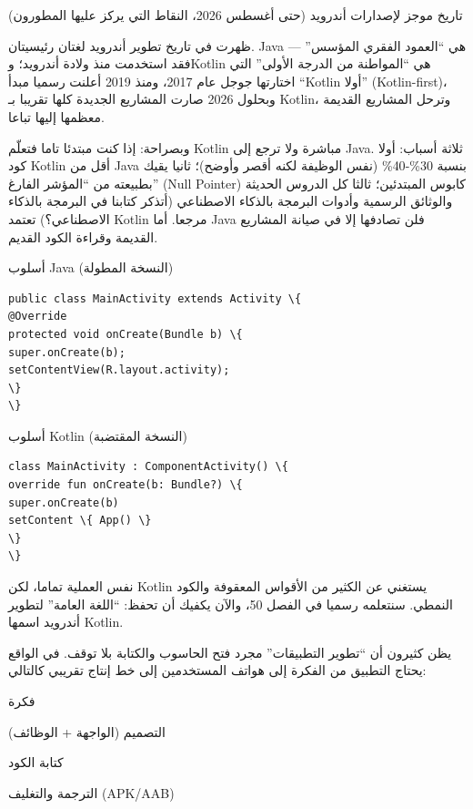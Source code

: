 \begin{center}\small\color{gray}تاريخ موجز لإصدارات أندرويد (حتى أغسطس 2026، النقاط التي يركز عليها المطورون)\end{center}


ظهرت في تاريخ تطوير أندرويد لغتان رئيسيتان. Java هي “العمود الفقري المؤسس” — فقد استخدمت منذ ولادة أندرويد؛ وKotlin هي “المواطنة من الدرجة الأولى” التي اختارتها جوجل عام 2017، ومنذ 2019 أعلنت رسميا مبدأ “Kotlin أولا” (Kotlin-first)، وبحلول 2026 صارت المشاريع الجديدة كلها تقريبا بـ Kotlin، وترحل المشاريع القديمة معظمها إليها تباعا.

وبصراحة: إذا كنت مبتدئا تاما فتعلّم Kotlin مباشرة ولا ترجع إلى Java. ثلاثة أسباب: أولا كود Kotlin أقل من Java بنسبة 30\%-40\% (نفس الوظيفة لكنه أقصر وأوضح)؛ ثانيا يقيك بطبيعته من “المؤشر الفارغ” (Null Pointer) كابوس المبتدئين؛ ثالثا كل الدروس الحديثة والوثائق الرسمية وأدوات البرمجة بالذكاء الاصطناعي (أتذكر كتابنا في البرمجة بالذكاء الاصطناعي؟) تعتمد Kotlin مرجعا. أما Java فلن تصادفها إلا في صيانة المشاريع القديمة وقراءة الكود القديم.

أسلوب Java (النسخة المطولة)

\begin{lstlisting}
public class MainActivity extends Activity \{
@Override
protected void onCreate(Bundle b) \{
super.onCreate(b);
setContentView(R.layout.activity);
\}
\}
\end{lstlisting}

أسلوب Kotlin (النسخة المقتضبة)

\begin{lstlisting}
class MainActivity : ComponentActivity() \{
override fun onCreate(b: Bundle?) \{
super.onCreate(b)
setContent \{ App() \}
\}
\}
\end{lstlisting}

نفس العملية تماما، لكن Kotlin يستغني عن الكثير من الأقواس المعقوفة والكود النمطي. سنتعلمه رسميا في الفصل 50، والآن يكفيك أن تحفظ: “اللغة العامة” لتطوير أندرويد اسمها Kotlin.


يظن كثيرون أن “تطوير التطبيقات” مجرد فتح الحاسوب والكتابة بلا توقف. في الواقع يحتاج التطبيق من الفكرة إلى هواتف المستخدمين إلى خط إنتاج تقريبي كالتالي:

فكرة

التصميم (الواجهة + الوظائف)

كتابة الكود

الترجمة والتغليف (APK/AAB)

